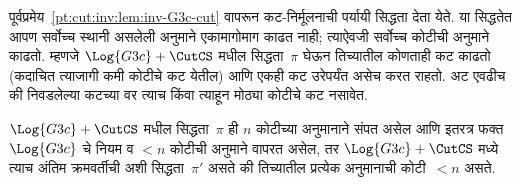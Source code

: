 पूर्वप्रमेय~\ref{pt:cut:inv:lem:inv-G3c-cut} वापरून
कट-निर्मूलनाची पर्यायी सिद्धता देता येते.
या सिद्धतेत आपण सर्वोच्च स्थानी असलेली
\CutCS{} अनुमाने एकामागोमाग काढत नाही;
त्याऐवजी सर्वोच्च कोटीची \CutCS{}
अनुमाने काढतो. म्हणजे
$\Log{G3c} + \CutCS$ मधील सिद्धता~$\pi$
घेऊन तिच्यातील कोणताही कट काढतो
(कदाचित त्याजागी कमी कोटीचे कट येतील)
आणि एकही कट उरेपर्यंत असेच करत राहतो.
अट एवढीच की निवडलेल्या कटच्या वर
त्याच किंवा त्याहून मोठ्या कोटीचे
कट नसावेत.

\begin{lem}\label{pt:cut:inv:lem:max-cut-red-G3c}
$\Log{G3c}+\CutCS$ मधील सिद्धता~$\pi$
ही $n$ कोटीच्या \CutCS{} अनुमानाने
संपत असेल आणि इतरत्र फक्त
$\Log{G3c}$ चे नियम व $<n$ कोटीची
\CutCS{} अनुमाने वापरत असेल, तर
$\Log{G3c} + \CutCS$ मध्ये
त्याच अंतिम क्रमवर्तीची अशी सिद्धता~$\pi'$
असते की तिच्यातील प्रत्येक \CutCS{}
अनुमानाची कोटी~$<n$ असते.
\end{lem}

